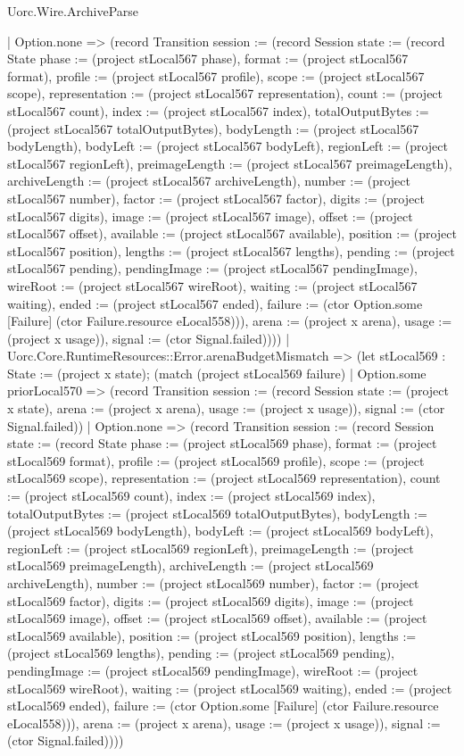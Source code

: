 \begin{lexlean}{Uorc.Wire.ArchiveParse}
\begin{semanticmodule}
{        | Option.none => (record Transition {session := (record Session {state := (record State {phase := (project stLocal567 phase), format := (project stLocal567 format), profile := (project stLocal567 profile), scope := (project stLocal567 scope), representation := (project stLocal567 representation), count := (project stLocal567 count), index := (project stLocal567 index), totalOutputBytes := (project stLocal567 totalOutputBytes), bodyLength := (project stLocal567 bodyLength), bodyLeft := (project stLocal567 bodyLeft), regionLeft := (project stLocal567 regionLeft), preimageLength := (project stLocal567 preimageLength), archiveLength := (project stLocal567 archiveLength), number := (project stLocal567 number), factor := (project stLocal567 factor), digits := (project stLocal567 digits), image := (project stLocal567 image), offset := (project stLocal567 offset), available := (project stLocal567 available), position := (project stLocal567 position), lengths := (project stLocal567 lengths), pending := (project stLocal567 pending), pendingImage := (project stLocal567 pendingImage), wireRoot := (project stLocal567 wireRoot), waiting := (project stLocal567 waiting), ended := (project stLocal567 ended), failure := (ctor Option.some [Failure] (ctor Failure.resource eLocal558))}), arena := (project x arena), usage := (project x usage)}), signal := (ctor Signal.failed)})))
      | Uorc.Core.RuntimeResources::Error.arenaBudgetMismatch => (let stLocal569 : State := (project x state); (match (project stLocal569 failure)
        | Option.some priorLocal570 => (record Transition {session := (record Session {state := (project x state), arena := (project x arena), usage := (project x usage)}), signal := (ctor Signal.failed)})
        | Option.none => (record Transition {session := (record Session {state := (record State {phase := (project stLocal569 phase), format := (project stLocal569 format), profile := (project stLocal569 profile), scope := (project stLocal569 scope), representation := (project stLocal569 representation), count := (project stLocal569 count), index := (project stLocal569 index), totalOutputBytes := (project stLocal569 totalOutputBytes), bodyLength := (project stLocal569 bodyLength), bodyLeft := (project stLocal569 bodyLeft), regionLeft := (project stLocal569 regionLeft), preimageLength := (project stLocal569 preimageLength), archiveLength := (project stLocal569 archiveLength), number := (project stLocal569 number), factor := (project stLocal569 factor), digits := (project stLocal569 digits), image := (project stLocal569 image), offset := (project stLocal569 offset), available := (project stLocal569 available), position := (project stLocal569 position), lengths := (project stLocal569 lengths), pending := (project stLocal569 pending), pendingImage := (project stLocal569 pendingImage), wireRoot := (project stLocal569 wireRoot), waiting := (project stLocal569 waiting), ended := (project stLocal569 ended), failure := (ctor Option.some [Failure] (ctor Failure.resource eLocal558))}), arena := (project x arena), usage := (project x usage)}), signal := (ctor Signal.failed)})))
}
\end{semanticmodule}
\end{lexlean}
